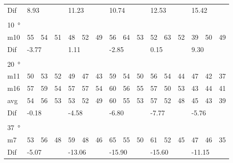 \begin{table}[H]
\begin{tabular}{l|l|l|l|l|l|l|l|l|l|l|l|l|lll}
Dif & \multicolumn{3}{l|}{8.93} & \multicolumn{3}{l|}{11.23} & \multicolumn{3}{l|}{10.74} & \multicolumn{3}{l|}{12.53} & \multicolumn{3}{l}{15.42} \\ 
 \multicolumn{16}{l}{ } \\                             
\SI{10}{\degree}   & \multicolumn{3}{l|}{} & \multicolumn{3}{l|}{} & \multicolumn{3}{l|}{} & \multicolumn{3}{l|}{} & \multicolumn{3}{l}{}   \\  \hline
m10   &  55    &  54    &  51    & 48     &  52    &  49    & 56     &  64     &  53    &  52     &  63    &  52    & \multicolumn{1}{l|}{39} & \multicolumn{1}{l|}{50} & 49 \\ \hline
Dif & \multicolumn{3}{l|}{-3.77} & \multicolumn{3}{l|}{1.11} & \multicolumn{3}{l|}{-2.85} & \multicolumn{3}{l|}{0.15} & \multicolumn{3}{l}{9.30}  \\ 
 \multicolumn{16}{l}{ } \\                             
\SI{20}{\degree}   & \multicolumn{3}{l|}{} & \multicolumn{3}{l|}{} & \multicolumn{3}{l|}{} & \multicolumn{3}{l|}{} & \multicolumn{3}{l}{}   \\  \hline
m11    & 50     &  53    &  52    &  49    & 47     &  43    &  59    &  54     &  50    &   56    &  54    &   44   & \multicolumn{1}{l|}{47} & \multicolumn{1}{l|}{42} & 37 \\
m16    & 57     & 59     &  54    &  57    & 57     & 54     &   60   &  56     &  55    &  57     &  50    &  53    & \multicolumn{1}{l|}{43} & \multicolumn{1}{l|}{44} & 41 \\ \hline
avg &  54    &  56    &  53    &   53   &  52    &  49    &  60    &   55    &  53    &   57    &  52    &  48    & \multicolumn{1}{l|}{45} & \multicolumn{1}{l|}{43}  &39  \\ \hline  
Dif & \multicolumn{3}{l|}{-0.18} & \multicolumn{3}{l|}{-4.58} & \multicolumn{3}{l|}{-6.80} & \multicolumn{3}{l|}{-7.77} & \multicolumn{3}{l}{-5.76} \\ 
 \multicolumn{16}{l}{ } \\                             
\SI{37}{\degree}   & \multicolumn{3}{l|}{} & \multicolumn{3}{l|}{} & \multicolumn{3}{l|}{} & \multicolumn{3}{l|}{} & \multicolumn{3}{l}{}   \\  \hline
m7    & 53     & 56     & 48     &  59    & 48     &  46    & 65     & 55      &  50    &   61    & 52     &   45   & \multicolumn{1}{l|}{47} & \multicolumn{1}{l|}{46} & 35 \\ \hline
Dif & \multicolumn{3}{l|}{-5.07} & \multicolumn{3}{l|}{-13.06} & \multicolumn{3}{l|}{-15.90} & \multicolumn{3}{l|}{-15.60} & \multicolumn{3}{l}{-11.15}                               
\end{tabular}
\end{table}





